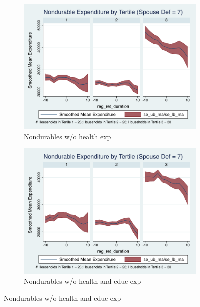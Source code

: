 \documentclass[11pt,onecolumn]{article}
\numberwithin{figure}{section}
\begin{document}
\begin{figure}
  \begin{subfigure}{0.5\textwidth}
  \centering
 	\includegraphics[width=0.9\linewidth]{../ConsumptionPostRetirement_by_SpouseDef/Smoothed_xhealth/spouse_def_7.pdf}
    \caption{Nondurables w/o health exp}
    \label{fig:chapter001_dist_001}
  \end{subfigure}
  	\hspace{1cm}
  \begin{subfigure}{0.5\textwidth}
 	\includegraphics[width=0.9\linewidth]{../ConsumptionPostRetirement_by_SpouseDef/Smoothed_xhealth_educ/spouse_def_7.pdf}
    \caption{Nondurables w/o health and educ exp}
    \label{fig:chapter001_reward_001}
  \end{subfigure}
\end{figure}
\clearpage
\end{document}
